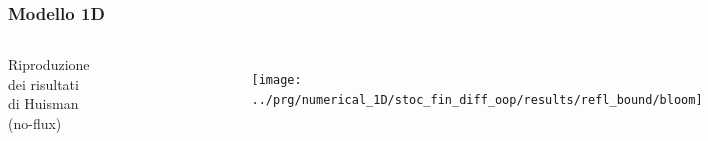 \begin{frame}
  \frametitle{Modello 1D}
  \begin{columns}

    Riproduzione dei risultati di Huisman (no-flux)
    \begin{figure}[!htb]
      \centering
      \includegraphics[width=\textwidth]{../img/huisman_lowvel_minimal}
    \end{figure}

    \begin{figure}[!htb]
      \centering
      \texttt{[image: ../prg/numerical\_1D/stoc\_fin\_diff\_oop/results/refl\_bound/bloom]}
    \end{figure}

  \end{columns}
\end{frame}

